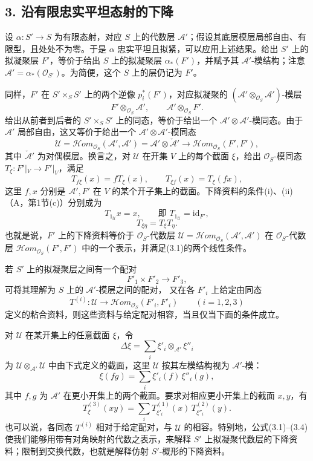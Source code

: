 \subsection*{3. 沿有限忠实平坦态射的下降}
设 $\alpha:S'\to S$ 为有限态射，对应 $S$ 上的代数层 $\mathcal A'$；假设其底层模层局部自由、有限型，且处处不为零。于是 $\alpha$ 忠实平坦且拟紧，可以应用上述结果。给出 $S'$ 上的拟凝聚层 $F'$，等价于给出 $S$ 上的拟凝聚层 $\alpha_*(F')$，并赋予其 $\mathcal A'$-模结构；注意 $\mathcal A'=\alpha_*(\mathcal O_{S'})$。为简便，这个 $S$ 上的层仍记为 $F'$。

同样，$F'$ 在 $S'\times_SS'$ 上的两个逆像 $p_i^*(F')$，对应拟凝聚的 $(\mathcal A'\otimes_{\mathcal O_S}\mathcal A')$-模层
\[
F'\otimes_{\mathcal O_S}\mathcal A',\qquad
\mathcal A'\otimes_{\mathcal O_S}F'.
\]
给出从前者到后者的 $S'\times_SS'$ 上的同态，等价于给出一个 $\mathcal A'\otimes\mathcal A'$-模同态。由于 $\mathcal A'$ 局部自由，这又等价于给出一个 $\mathcal A'\otimes\mathcal A'$-模同态
\[
\mathcal U=\mathcal H\!om_{\mathcal O_S}(\mathcal A',\mathcal A')
=\mathcal A'\otimes\check{\mathcal A}'
\longrightarrow\mathcal H\!om_{\mathcal O_S}(F',F'),
\]
其中 $\check{\mathcal A}'$ 为对偶模层。换言之，对 $\mathcal U$ 在开集 $V$ 上的每个截面 $\xi$，给出 $\mathcal O_S$-模同态 $T_\xi:F'|_V\to F'|_V$，满足
\[
T_{f\xi}(x)=fT_\xi(x),\qquad
T_{\xi f}(x)=T_\xi(fx),
\tag{3.1}
\]
这里 $f,x$ 分别是 $\mathcal A',F'$ 在 $V$ 的某个开子集上的截面。下降资料的条件(i)、(ii)（A，第1节(c)）分别成为
\[
T_{1_{\mathcal U}}x=x,\qquad\text{即 }T_{1_{\mathcal U}}=\mathrm{id}_{F'},
\tag{3.2}
\]
\[
T_{\xi\eta}=T_\xi T_\eta.
\tag{3.3}
\]
也就是说，$F'$ 上的下降资料等价于 $\mathcal O_S$-代数层 $\mathcal U=\mathcal H\!om_{\mathcal O_S}(\mathcal A',\mathcal A')$ 在 $\mathcal O_S$-代数层 $\mathcal H\!om_{\mathcal O_S}(F',F')$ 中的一个表示，并满足(3.1)的两个线性条件。

若 $S'$ 上的拟凝聚层之间有一个配对
\[
F'_1\times F'_2\longrightarrow F'_3,
\]
可将其理解为 $S$ 上的 $\mathcal A'$-模层之间的配对，
又在各 $F'_i$ 上给定由同态
\[
T^{(i)}:\mathcal U\longrightarrow
\mathcal H\!om_{\mathcal O_S}(F'_i,F'_i)\qquad(i=1,2,3)
\]
定义的粘合资料，则这些资料与给定配对相容，当且仅当下面的条件成立。

对 $\mathcal U$ 在某开集上的任意截面 $\xi$，令
\[
\Delta\xi=\sum_i\xi'_i\otimes_{\mathcal A'}\xi''_i
\]
为 $\mathcal U\otimes_{\mathcal A'}\mathcal U$ 中由下式定义的截面，这里 $\mathcal U$ 按其左模结构视为 $\mathcal A'$-模：
\[
\xi(fg)=\sum_i\xi'_i(f)\,\xi''_i(g),
\]
其中 $f,g$ 为 $\mathcal A'$ 在更小开集上的两个截面。要求对相应更小开集上的截面 $x,y$，有
\[
T^{(3)}_\xi(xy)=\sum_i T^{(1)}_{\xi'_i}(x)\,T^{(2)}_{\xi''_i}(y).
\tag{3.4}
\]
也可以说，各同态 $T^{(i)}$ 相对于给定配对，与 $\mathcal U$ 的相容。特别地，公式(3.1)--(3.4)使我们能够用带有对角映射的代数之表示，来解释 $S'$ 上拟凝聚代数层的下降资料；限制到交换代数，也就是解释仿射 $S'$-概形的下降资料。


